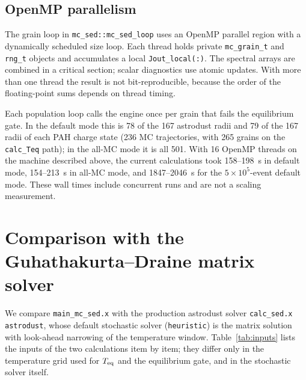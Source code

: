 \documentclass{my_memo}
\newcommand{\Teq}{T_{\rm eq}}
\begin{document}
\subsection{OpenMP parallelism}

The grain loop in \verb|mc_sed::mc_sed_loop| uses an OpenMP
parallel region with a dynamically scheduled size loop. Each thread
holds private \verb|mc_grain_t| and \verb|rng_t| objects and
accumulates a local \verb|Jout_local(:)|. The spectral arrays are
combined in a critical section; scalar diagnostics use atomic updates.
With more than one thread the result is not bit-reproducible, because
the order of the floating-point sums depends on thread timing.

Each population loop calls the engine once per grain that fails the
equilibrium gate. In the default mode this is 78 of the 167 astrodust
radii and 79 of the 167 radii of each PAH charge state (236 MC
trajectories, with 265 grains on the \texttt{calc\_Teq} path); in the
all-MC mode it is all 501. With 16 OpenMP threads on the machine
described above, the current calculations took 158--198~s in default
mode, 154--213~s in all-MC mode, and 1847--2046~s for the
$5\times10^5$-event default mode. These wall times include concurrent
runs and are not a scaling measurement.

\section{Comparison with the Guhathakurta--Draine matrix solver}\label{sec:compare}

We compare \verb|main_mc_sed.x| with the production astrodust
solver \verb|calc_sed.x astrodust|, whose default stochastic solver
(\texttt{heuristic}) is the \citet{GuhathakurtaDraine1989} matrix
solution with look-ahead narrowing of the temperature window.
Table~\ref{tab:inputs} lists the inputs of the two calculations item by
item; they differ only in the temperature grid used for $\Teq$ and the
equilibrium gate, and in the stochastic solver itself.
\end{document}
